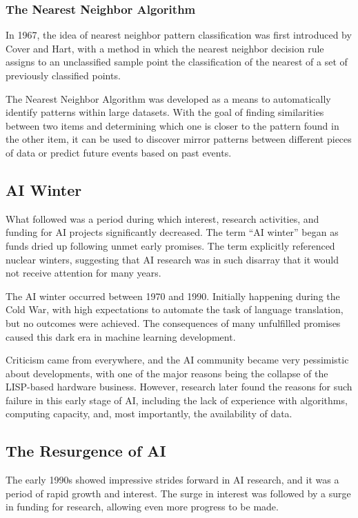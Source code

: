\documentclass{article}
\begin{document}
\subsubsection{The Nearest Neighbor Algorithm}
In 1967, the idea of nearest neighbor pattern classification was first introduced by Cover and Hart, with a method in which the nearest neighbor decision rule assigns to an unclassified sample point the classification of the nearest of a set of previously classified points. 
\par
The Nearest Neighbor Algorithm was developed as a means to automatically identify patterns within large datasets. With the goal of finding similarities between two items and determining which one is closer to the pattern found in the other item, it can be used to discover mirror patterns between different pieces of data or predict future events based on past events. 
\par
\subsection{AI Winter}
What followed was a period during which interest, research activities, and funding for AI projects significantly decreased. The term ``AI winter'' began as funds dried up following unmet early promises. The term explicitly referenced nuclear winters, suggesting that AI research was in such disarray that it would not receive attention for many years. 
\par
The AI winter occurred between 1970 and 1990. Initially happening during the Cold War, with high expectations to automate the task of language translation, but no outcomes were achieved. The consequences of many unfulfilled promises caused this dark era in machine learning development. 
\par
Criticism came from everywhere, and the AI community became very pessimistic about developments, with one of the major reasons being the collapse of the LISP-based hardware business. However, research later found the reasons for such failure in this early stage of AI, including the lack of experience with algorithms, computing capacity, and, most importantly, the availability of data. 
\par
\subsection{The Resurgence of AI}
The early 1990s showed impressive strides forward in AI research, and it was a period of rapid growth and interest. The surge in interest was followed by a surge in funding for research, allowing even more progress to be made. 
\par
\end{document}

